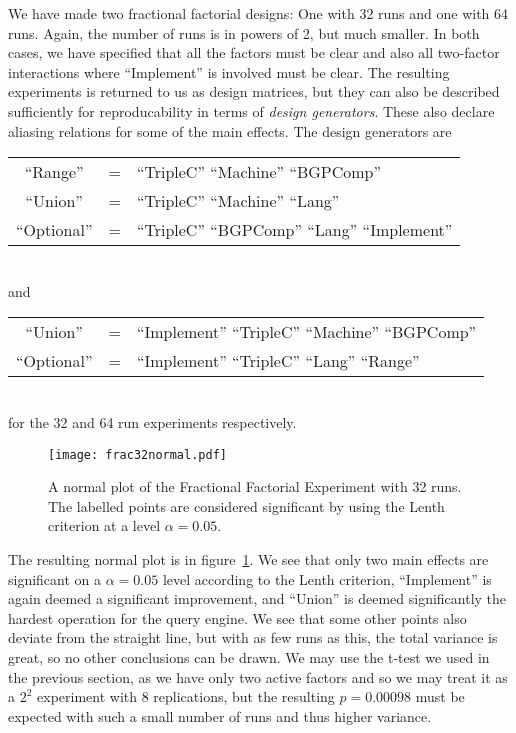 \documentclass{llncs}
\begin{document}
We have made two fractional factorial designs: One with 32 runs and
one with 64 runs. Again, the number of runs is in powers of 2, but
much smaller. In both cases, we have specified that all the factors
must be clear and also all two-factor interactions where ``Implement''
is involved must be clear. The resulting experiments is returned to us
as design matrices, but they can also be described sufficiently for
reproducability in terms of \emph{design generators}. These also
declare aliasing relations for some of the main effects. The design
generators are\\
\begin{tabular}{ccl}
``Range'' &=& ``TripleC'' ``Machine'' ``BGPComp'' \\  
``Union'' &=& ``TripleC'' ``Machine'' ``Lang'' \\  
``Optional'' &=& ``TripleC'' ``BGPComp'' ``Lang'' ``Implement'' 
\end{tabular}
\\and\\
\begin{tabular}{ccl}
``Union'' &=& ``Implement''  ``TripleC''  ``Machine'' ``BGPComp'' \\
``Optional'' &=& ``Implement''  ``TripleC'' ``Lang''  ``Range'' 
\end{tabular}
\\for the 32 and 64 run experiments respectively.

\begin{figure}[h!]
  \texttt{[image: frac32normal.pdf]}
  \caption{A normal plot of the Fractional Factorial Experiment with
    32 runs. The labelled points are considered significant by using
    the Lenth criterion at a level
    $\alpha=0.05$.}\label{fig:frac32normal}
\end{figure}


The resulting normal plot is in figure~\ref{fig:frac32normal}. We see
that only two main effects are significant on a $\alpha = 0.05$ level
according to the Lenth criterion, ``Implement'' is again deemed a
significant improvement, and ``Union'' is deemed significantly the
hardest operation for the query engine. We see that some other points
also deviate from the straight line, but with as few runs as this, the
total variance is great, so no other conclusions can be drawn. We may
use the t-test we used in the previous section, as we have only two
active factors and so we may treat it as a $2^2$ experiment with 8
replications, but the resulting $p = 0.00098$ must be expected with
such a small number of runs and thus higher variance.
\end{document}

